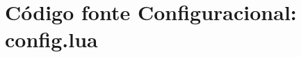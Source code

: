 \documentclass[journal]{IEEEtran}
\begin{document}
%


\appendices
\section{Código fonte Configuracional: config.lua}
\end{document}

